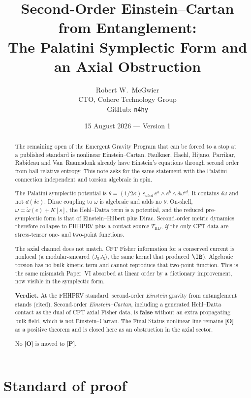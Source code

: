 \documentclass[11pt]{article}
\title{\textbf{Second-Order Einstein--Cartan from Entanglement:\\
The Palatini Symplectic Form and an Axial Obstruction}}
\author{Robert W.\ McGwier\\
\small CTO, Cohere Technology Group\\
\small GitHub: \texttt{n4hy}}
\date{15 August 2026 --- Version 1}
\theoremstyle{definition}
\newcommand{\pP}{\textbf{[P]}}
\newcommand{\pO}{\textbf{[O]}}
\begin{document}
\maketitle

\begin{abstract}
\noindent
The remaining open of the Emergent Gravity Program that can be forced
to a stop at a published standard is nonlinear Einstein--Cartan.
Faulkner, Haehl, Hijano, Parrikar, Rabideau and Van~Raamsdonk
\cite{FHHPRV2017} already have Einstein's equations through second
order from ball relative entropy. This note asks for the same
statement with the Palatini connection independent and torsion
algebraic in spin.

The Palatini symplectic potential is
$\theta=(1/2\kappa)\,\varepsilon_{abcd}\,e^a\wedge e^b\wedge\delta\omega^{cd}$.
It contains $\delta\omega$ and not $d(\delta e)$. Dirac coupling to
$\omega$ is algebraic and adds no $\theta$. On-shell,
$\omega=\mathring{\omega}(e)+K[s]$, the Hehl--Datta term is a
potential, and the reduced pre-symplectic form is that of
Einstein--Hilbert plus Dirac. Second-order metric dynamics therefore
collapse to FHHPRV plus a contact source $T_{\mathrm{HD}}$,
\emph{if} the only CFT data are stress-tensor one- and two-point
functions.

The axial channel does not match. CFT Fisher information for a
conserved current is nonlocal (a modular-smeared $\langle J_5 J_5\rangle$,
the same kernel that produced $\IB$). Algebraic torsion has no bulk
kinetic term and cannot reproduce that two-point function. This is
the same mismatch Paper~VI absorbed at linear order by a dictionary
improvement, now visible in the symplectic form.

\textbf{Verdict.} At the FHHPRV standard: second-order \emph{Einstein}
gravity from entanglement stands (cited). Second-order
\emph{Einstein--Cartan}, including a generated Hehl--Datta contact
as the dual of CFT axial Fisher data, is \textbf{false} without an
extra propagating bulk field, which is not Einstein--Cartan.
The Final Status nonlinear line remains \pO{} as a positive theorem
and is closed here as an obstruction in the axial sector.

No \pO{} is moved to \pP{}.
\end{abstract}

\section*{Standard of proof}
\end{document}
